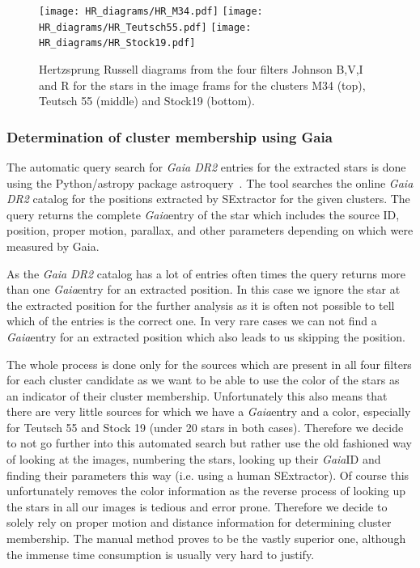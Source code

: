 \documentclass{article}
\begin{document}
\begin{figure}[H]
    \centering
    \texttt{[image: HR\_diagrams/HR\_M34.pdf]}
    \texttt{[image: HR\_diagrams/HR\_Teutsch55.pdf]}
    \texttt{[image: HR\_diagrams/HR\_Stock19.pdf]}
    \caption{Hertzsprung Russell diagrams from the four filters Johnson B,V,I and R for the stars in the image frams for the clusters M34 (top), Teutsch 55 (middle) and Stock19 (bottom).}
    \label{fig:HR}
\end{figure}

\subsubsection{Determination of cluster membership using Gaia}
\label{sec:Gaia}

The automatic query search for \textit{Gaia DR2} entries for the extracted stars is done using the Python/astropy package astroquery~\parencite{astroquery}. The tool searches the online \textit{Gaia DR2} catalog for the positions extracted by SExtractor for the given clusters. The query returns the complete \textit{Gaia}entry of the star which includes the source ID, position, proper motion, parallax, and other parameters depending on which were measured by Gaia. 

As the \textit{Gaia DR2} catalog has a lot of entries often times the query returns more than one \textit{Gaia}entry for an extracted position. In this case we ignore the star at the extracted position for the further analysis as it is often not possible to tell which of the entries is the correct one. In very rare cases we can not find a \textit{Gaia}entry for an extracted position which also leads to us skipping the position. 

The whole process is done only for the sources which are present in all four filters for each cluster candidate as we want to be able to use the color of the stars as an indicator of their cluster membership. Unfortunately this also means that there are very little sources for which we have a \textit{Gaia}entry and a color, especially for Teutsch 55 and Stock 19 (under 20 stars in both cases). Therefore we decide to not go further into this automated search but rather use the old fashioned way of looking at the images, numbering the stars, looking up their \textit{Gaia}ID and finding their parameters this way (i.e. using a human SExtractor). %
Of course this unfortunately removes the color information as the reverse process of looking up the stars in all our images is tedious and error prone. Therefore we decide to solely rely on proper motion and distance information for determining cluster membership. The manual method proves to be the vastly superior one, although the immense time consumption is usually very hard to justify.  
\end{document}
